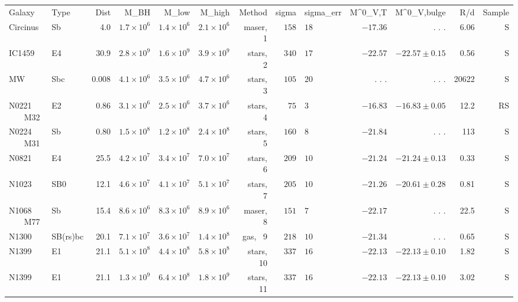 \documentclass[twosided,letterpaper,numberedappendix]{emulateapj}
\begin{document}
\begin{tabular}{llrrrrrr@{$\pm$}lrrrr}
Galaxy & Type & Dist & M_BH & M_low & M_high & Method & sigma & sigma_err & M^0_V,T & M^0_V,bulge & R/d & Sample\\
Circinus\tablenotemark{c}\tablenotemark{d}       &        Sb &    4.0 & $1.7\times10^{6}$ & $1.4\times10^{6}$ & $2.1\times10^{6}$ & maser, ~1 & $158$&$18$\tablenotemark{d} & $-17.36$ &  . . . &   6.06 & ~S\\
IC1459\tablenotemark{e}       &        E4 &   30.9 & $2.8\times10^{9}$ & $1.6\times10^{9}$ & $3.9\times10^{9}$ & stars, ~2 & $340$&$17$ & $-22.57$ & $-22.57 \pm 0.15$ &   0.56 & ~S\\
MW\tablenotemark{f}\tablenotemark{g}       &       Sbc &  0.008 & $4.1\times10^{6}$ & $3.5\times10^{6}$ & $4.7\times10^{6}$ & stars, ~3 & $105$&$20$ &  . . . &  . . . &  20622 & ~S\\
 N0221 ~~~ M32 &        E2 &   0.86 & $3.1\times10^{6}$ & $2.5\times10^{6}$ & $3.7\times10^{6}$ & stars, ~4 & $ 75$&$ 3$ & $-16.83$ & $-16.83 \pm 0.05$ &   12.2 & RS\\
 N0224 ~~~ M31 &        Sb &   0.80 & $1.5\times10^{8}$ & $1.2\times10^{8}$ & $2.4\times10^{8}$ & stars, ~5 & $160$&$ 8$ & $-21.84$ &  . . . &    113 & ~S\\
N0821\tablenotemark{h}       &        E4 &   25.5 & $4.2\times10^{7}$ & $3.4\times10^{7}$ & $7.0\times10^{7}$ & stars, ~6 & $209$&$10$ & $-21.24$ & $-21.24 \pm 0.13$ &   0.33 & ~S\\
 N1023       &       SB0 &   12.1 & $4.6\times10^{7}$ & $4.1\times10^{7}$ & $5.1\times10^{7}$ & stars, ~7 & $205$&$10$ & $-21.26$ & $-20.61 \pm 0.28$ &   0.81 & ~S\\
N1068\tablenotemark{g}\tablenotemark{i} ~~~ M77 &        Sb &   15.4 & $8.6\times10^{6}$ & $8.3\times10^{6}$ & $8.9\times10^{6}$ & maser, ~8 & $151$&$ 7$ & $-22.17$ &  . . . &   22.5 & ~S\\
N1300\tablenotemark{g}       &  SB(rs)bc &   20.1 & $7.1\times10^{7}$ & $3.6\times10^{7}$ & $1.4\times10^{8}$ &   gas, ~9 & $218$&$10$ & $-21.34$ &  . . . &   0.65 & ~S\\
N1399\tablenotemark{j}       &        E1 &   21.1 & $5.1\times10^{8}$ & $4.4\times10^{8}$ & $5.8\times10^{8}$ & stars, 10 & $337$&$16$ & $-22.13$ & $-22.13 \pm 0.10$ &   1.82 & ~S\\
N1399\tablenotemark{j}       &        E1 &   21.1 & $1.3\times10^{9}$ & $6.4\times10^{8}$ & $1.8\times10^{9}$ & stars, 11 & $337$&$16$ & $-22.13$ & $-22.13 \pm 0.10$ &   3.02 & ~S\\

\end{tabular}
\end{document}
